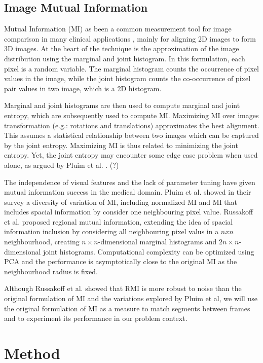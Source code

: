 \documentclass{article}
\begin{document}
\subsection{Image Mutual Information}

Mutual Information (MI) as been a common measurement tool for image comparison in many clinical applications \cite{mi}, mainly for aligning 2D images to form 3D images. At the heart of the technique is the approximation of the image distribution using the marginal and joint histogram. In this formulation, each pixel is a random variable. The marginal histogram counts the occurrence of pixel values in the image, while the joint histogram counts the co-occurrence of pixel pair values in two image, which is a 2D histogram. 

Marginal and joint histograms are then used to compute marginal and joint entropy, which are subsequently used to compute MI. Maximizing MI over images transformation (e.g.: rotations and translations) approximates the best alignment. This assumes a statistical relationship between two images which can be captured by the joint entropy. Maximizing MI is thus related to minimizing the joint entropy. Yet, the joint entropy may encounter some edge case problem when used alone, as argued by Pluim et al. \cite{mi}. (?)

The independence of visual features and the lack of parameter tuning have given mutual information success in the medical domain. Pluim et al. showed in their survey a diversity of variation of MI, including normalized MI and MI that includes spacial information by consider one neighbouring pixel value. Russakoff et al. \cite{rmi} proposed regional mutual information, extending the idea of spacial information inclusion by considering all neighbouring pixel valus in a $nxn$ neighbourhood, creating $n\times n$-dimensional marginal histograms and $2n\times n$-dimensional joint histograms. Computational complexity can be optimized using PCA and the performance is asymptotically close to the original MI as the neighbourhood radius is fixed. 

Although Russakoff et al. showed that RMI is more robust to noise than the original formulation of MI and the variations explored by Pluim et al, we will use the original formulation of MI as a measure to match segments between frames and to experiment its performance in our problem context. 

\section{Method}
\end{document}
